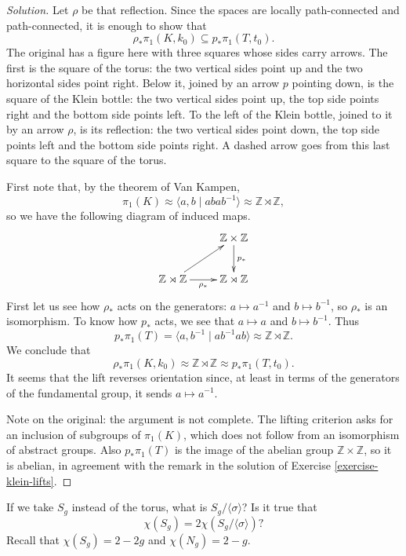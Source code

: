 \begin{proof}[Solution]
Let $\rho$ be that reflection. Since
the spaces are locally path-connected
and path-connected, it is enough to
show that
$$
\rho_*\pi_1(K,k_0)\subseteq
p_*\pi_1(T,t_0).
$$
The original has a figure here with
three squares whose sides carry arrows.
The first is the square of the torus:
the two vertical sides point up and the
two horizontal sides point right. Below
it, joined by an arrow $p$ pointing
down, is the square of the Klein bottle:
the two vertical sides point up, the top
side points right and the bottom side
points left. To the left of the Klein
bottle, joined to it by an arrow $\rho$,
is its reflection: the two vertical
sides point down, the top side points
left and the bottom side points right.
A dashed arrow goes from this last
square to the square of the torus.

First note that, by the theorem of Van
Kampen,
$$
\pi_1(K)\approx
\langle a,b\mid abab^{-1}\rangle
\approx\mathbb{Z}\rtimes\mathbb{Z},
$$
so we have the following diagram of
induced maps.
$$
\xymatrix{
  & \mathbb{Z}\times\mathbb{Z}
    \ar[d]^{p_*} \\
\mathbb{Z}\rtimes\mathbb{Z}
  \ar[r]_{\rho_*} \ar[ur]
  & \mathbb{Z}\rtimes\mathbb{Z}
}
$$
First let us see how $\rho_*$ acts on
the generators: $a\mapsto a^{-1}$ and
$b\mapsto b^{-1}$, so $\rho_*$ is an
isomorphism. To know how $p_*$ acts, we
see that $a\mapsto a$ and
$b\mapsto b^{-1}$. Thus
$$
p_*\pi_1(T)=
\langle a,b^{-1}\mid ab^{-1}ab\rangle
\approx\mathbb{Z}\rtimes\mathbb{Z}.
$$
We conclude that
$$
\rho_*\pi_1(K,k_0)\approx
\mathbb{Z}\rtimes\mathbb{Z}\approx
p_*\pi_1(T,t_0).
$$
It seems that the lift reverses
orientation since, at least in terms of
the generators of the fundamental group,
it sends $a\mapsto a^{-1}$.

Note on the original: the argument is
not complete. The lifting criterion
asks for an inclusion of subgroups of
$\pi_1(K)$, which does not follow from
an isomorphism of abstract groups. Also
$p_*\pi_1(T)$ is the image of the
abelian group
$\mathbb{Z}\times\mathbb{Z}$, so it is
abelian, in agreement with the remark
in the solution of
Exercise \ref{exercise-klein-lifts}.
\end{proof}

\begin{exercise}
\label{exercise-quotient-genus}
If we take $S_g$ instead of the torus,
what is $S_g/\langle\sigma\rangle$? Is
it true that
$$
\chi(S_g)=
2\chi(S_g/\langle\sigma\rangle)?
$$
Recall that $\chi(S_g)=2-2g$ and
$\chi(N_g)=2-g$.
\end{exercise}

